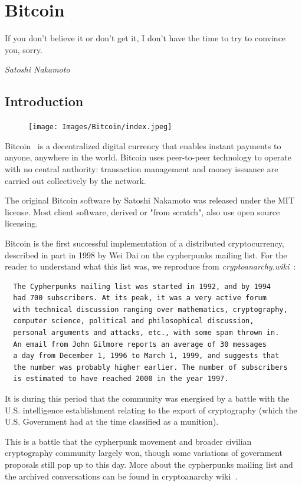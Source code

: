 \chapter{Bitcoin} \label{sec:Bitcoin}
%
\epigraph{If you don’t believe it or don’t get it, I don’t have the time to try to convince you, sorry.}{\textit{Satoshi Nakamoto}}
%
\section{Introduction}
\begin{figure}
\centering
\texttt{[image: Images/Bitcoin/index.jpeg]}
\end{figure}
Bitcoin~\cite{Nakamoto_bitcoin:a} is a decentralized digital currency that enables instant payments to anyone, anywhere in the world. Bitcoin uses peer-to-peer technology to operate with no central authority: transaction management and money issuance are carried out collectively by the network.

The original Bitcoin software by Satoshi Nakamoto was released under the MIT license. Most client software, derived or "from scratch", also use open source licensing.

Bitcoin is the first successful implementation of a distributed cryptocurrency, described in part in 1998 by Wei Dai on the cypherpunks mailing list. For the reader to understand what this list was, we reproduce from \emph{cryptoanarchy.wiki}~\cite{cryptoanarchy}:

\begin{verbatim}
  The Cypherpunks mailing list was started in 1992, and by 1994
  had 700 subscribers. At its peak, it was a very active forum
  with technical discussion ranging over mathematics, cryptography,
  computer science, political and philosophical discussion,
  personal arguments and attacks, etc., with some spam thrown in.
  An email from John Gilmore reports an average of 30 messages
  a day from December 1, 1996 to March 1, 1999, and suggests that
  the number was probably higher earlier. The number of subscribers
  is estimated to have reached 2000 in the year 1997.
\end{verbatim}

It is during this period that the community was energised by a battle with the U.S. intelligence establishment relating to the export of cryptography (which the U.S. Government had at the time classified as a munition).
\pagebreak

This is a battle that the cypherpunk movement and broader civilian cryptography community largely won, though some variations of government proposals still pop up to this day. More about the cypherpunks mailing list and the archived conversations can be found in cryptoanarchy wiki~\cite{cryptoanarchy}.

